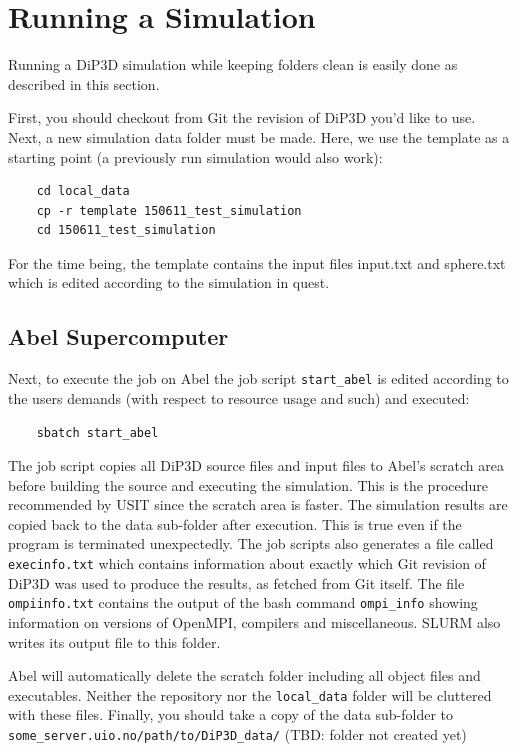 \documentclass[10pt,a4paper]{article}
\begin{document}
\section{Running a Simulation}
Running a DiP3D simulation while keeping folders clean is easily done as described in this section.

First, you should checkout from Git the revision of DiP3D you'd like to use. Next, a new simulation data folder must be made. Here, we use the template as a starting point (a previously run simulation would also work):

\begin{lstlisting}
	cd local_data
	cp -r template 150611_test_simulation
	cd 150611_test_simulation
\end{lstlisting}
For the time being, the template contains the input files input.txt and sphere.txt which is edited according to the simulation in quest.

\subsection{Abel Supercomputer}
Next, to execute the job on Abel the job script \lstinline$start_abel$ is edited according to the users demands (with respect to resource usage and such) and executed:

\begin{lstlisting}
	sbatch start_abel
\end{lstlisting}

The job script copies all DiP3D source files and input files to Abel's scratch area before building the source and executing the simulation. This is the procedure recommended by USIT since the scratch area is faster. The simulation results are copied back to the data sub-folder after execution. This is true even if the program is terminated unexpectedly. The job scripts also generates a file called \lstinline$execinfo.txt$ which contains information about exactly which Git revision of DiP3D was used to produce the results, as fetched from Git itself. The file \lstinline$ompiinfo.txt$ contains the output of the bash command \lstinline$ompi_info$ showing information on versions of OpenMPI, compilers and miscellaneous. SLURM also writes its output file to this folder.

Abel will automatically delete the scratch folder including all object files and executables. Neither the repository nor the \lstinline$local_data$ folder will be cluttered with these files. Finally, you should take a copy of the data sub-folder to \lstinline$some_server.uio.no/path/to/DiP3D_data/$ (TBD: folder not created yet)
\end{document}
